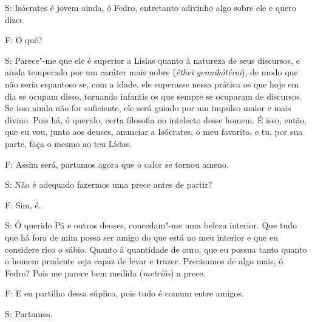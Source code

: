  

S: Isócrates é jovem ainda, ó Fedro, \bekker{[279a]} entretanto adivinho algo
sobre ele e quero dizer.

 

F: O quê?

 

S: Parece"-me que ele é superior a Lísias quanto à natureza de seus
discursos, e ainda temperado por um caráter mais nobre (\emph{ḗthei
gennikôtéroi}), de modo que não seria espantoso se, com a idade, ele
superasse nessa prática os que hoje em dia se ocupam disso, tornando
infantis os que sempre se ocuparam de discursos. Se isso ainda não for
suficiente, ele será guiado por um impulso maior e mais divino. Pois há,
ó querido, certa filosofia no intelecto desse homem. \bekker{[279b]} É isso,
então, que eu vou, junto aos deuses, anunciar a Isócrates, o meu
favorito, e tu, por sua parte, faça o mesmo ao teu Lísias.

 

F: Assim será, partamos agora que o calor se tornou ameno.

 

S: Não é adequado fazermos uma prece antes de partir?

 

F: Sim, é.

 

S: Ó querido Pã e outros deuses, concedam"-me uma beleza interior. Que
tudo que há fora de mim possa ser amigo do que está no meu interior
\bekker{[279c]} e que eu considere rico o sábio. Quanto à
quantidade de ouro, que eu possua tanto quanto o homem prudente seja
capaz de levar e trazer. Precisamos de algo mais, ó Fedro? Pois me
parece bem medida (\emph{metríôs}) a prece.

F: E eu partilho dessa súplica, pois tudo é comum entre
amigos.

S: Partamos.


